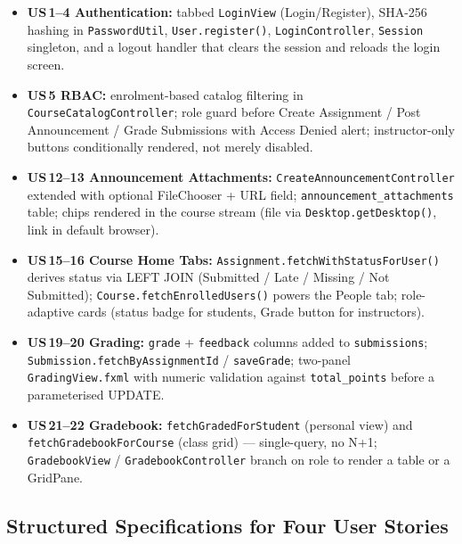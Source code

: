 \documentclass[12pt, a4paper]{article}
\begin{document}
{\sloppy
\begin{itemize}
  \item \textbf{US\,1--4 Authentication:} tabbed \texttt{LoginView} (Login/Register), SHA-256 hashing in \texttt{PasswordUtil}, \texttt{User.register()}, \texttt{LoginController}, \texttt{Session} singleton, and a logout handler that clears the session and reloads the login screen.
  \item \textbf{US\,5 RBAC:} enrolment-based catalog filtering in \texttt{CourseCatalogController}; role guard before Create Assignment / Post Announcement / Grade Submissions with Access Denied alert; instructor-only buttons conditionally rendered, not merely disabled.
  \item \textbf{US\,12--13 Announcement Attachments:} \texttt{CreateAnnouncementController} extended with optional FileChooser + URL field; \texttt{announcement\_attachments} table; chips rendered in the course stream (file via \texttt{Desktop.getDesktop()}, link in default browser).
  \item \textbf{US\,15--16 Course Home Tabs:} \texttt{Assignment.fetchWithStatusForUser()} derives status via LEFT JOIN (Submitted / Late / Missing / Not Submitted); \texttt{Course.fetchEnrolledUsers()} powers the People tab; role-adaptive cards (status badge for students, Grade button for instructors).
  \item \textbf{US\,19--20 Grading:} \texttt{grade} + \texttt{feedback} columns added to \texttt{submissions}; \texttt{Submission.fetchByAssignmentId} / \texttt{saveGrade}; two-panel \texttt{GradingView.fxml} with numeric validation against \texttt{total\_points} before a parameterised UPDATE.
  \item \textbf{US\,21--22 Gradebook:} \texttt{fetchGradedForStudent} (personal view) and \texttt{fetchGradebookForCourse} (class grid) --- single-query, no N+1; \texttt{GradebookView} / \texttt{GradebookController} branch on role to render a table or a GridPane.
\end{itemize}
\par}

\subsection{Structured Specifications for Four User Stories}
\end{document}
